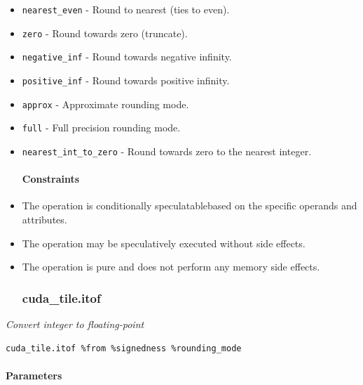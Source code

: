 \documentclass{article}
\begin{document}
\begin{itemize}
\item \texttt{nearest\_even} - Round to nearest (ties to even).
\item \texttt{zero} - Round towards zero (truncate).
\item \texttt{negative\_inf} - Round towards negative infinity.
\item \texttt{positive\_inf} - Round towards positive infinity.
\item \texttt{approx} - Approximate rounding mode.
\item \texttt{full} - Full precision rounding mode.
\item \texttt{nearest\_int\_to\_zero} - Round towards zero to the nearest integer.


\paragraph{Constraints}

\item The operation is conditionally speculatablebased on the specific operands and attributes.
\item The operation may be speculatively executed without side effects.
\item The operation is pure and does not perform any memory side effects.


\subsubsection{cuda\_tile.itof}

\end{itemize}
\textit{Convert integer to floating-point}


\begin{lstlisting}
cuda_tile.itof %from %signedness %rounding_mode
\end{lstlisting}

\paragraph{Parameters}
\end{document}
